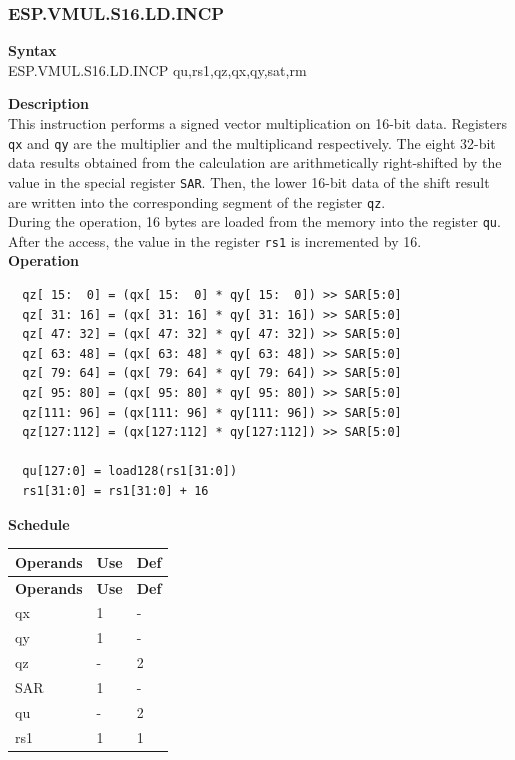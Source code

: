 \newpage
\subsubsection{ESP.VMUL.S16.LD.INCP}\label{instruction:ESPVMULS16LDINCP}
\textbf{Syntax}\\
ESP.VMUL.S16.LD.INCP qu,rs1,qz,qx,qy,sat,rm

\textbf{Description}\\
This instruction performs a signed vector multiplication on 16-bit data. Registers \lstinline{qx} and \lstinline{qy} are the multiplier and the multiplicand respectively. The eight 32-bit data results obtained from the calculation are arithmetically right-shifted by the value in the special register \lstinline{SAR}. Then, the lower 16-bit data of the shift result are written into the corresponding segment of the register \lstinline{qz}.\\
During the operation, 16 bytes are loaded from the memory into the register \lstinline{qu}. After the access, the value in the register \lstinline{rs1} is incremented by 16.\\
\textbf{Operation}
\begin{lstlisting}
  qz[ 15:  0] = (qx[ 15:  0] * qy[ 15:  0]) >> SAR[5:0]
  qz[ 31: 16] = (qx[ 31: 16] * qy[ 31: 16]) >> SAR[5:0]
  qz[ 47: 32] = (qx[ 47: 32] * qy[ 47: 32]) >> SAR[5:0]
  qz[ 63: 48] = (qx[ 63: 48] * qy[ 63: 48]) >> SAR[5:0]
  qz[ 79: 64] = (qx[ 79: 64] * qy[ 79: 64]) >> SAR[5:0]
  qz[ 95: 80] = (qx[ 95: 80] * qy[ 95: 80]) >> SAR[5:0]
  qz[111: 96] = (qx[111: 96] * qy[111: 96]) >> SAR[5:0]
  qz[127:112] = (qx[127:112] * qy[127:112]) >> SAR[5:0]

  qu[127:0] = load128(rs1[31:0])
  rs1[31:0] = rs1[31:0] + 16
\end{lstlisting}


\textbf{Schedule}\\
\begin{longtable}[c]{|l|l|l|}
    \hline
    \rowcolor{lightgray}
    \textbf{Operands} & \textbf{Use} & \textbf{Def} \\\hline
    \endfirsthead
    \hline
    \rowcolor{lightgray}
     \textbf{Operands} & \textbf{Use} & \textbf{Def} \\\hline
    \endhead
    \hline
    \endfoot

    qx & 1 & - \\\hline
  qy & 1 & - \\\hline
     qz & - & 2 \\\hline
    SAR & 1 & - \\\hline
    qu & - & 2 \\\hline
    rs1 & 1 & 1
\end{longtable}

